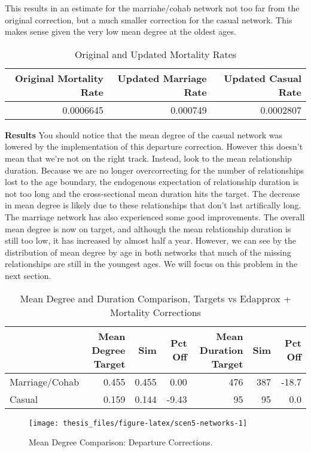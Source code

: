 \documentclass [11pt, proquest] {uwthesis}[2015/03/03]
\begin{document}
This results in an estimate for the marriahe/cohab network not too far
from the original correction, but a much smaller correction for the
casual network. This makes sense given the very low mean degree at the
oldest ages.
\begin{table}

\caption{\label{tab:departure-tab}Original and Updated Mortality Rates}
\centering
\begin{tabular}[t]{rrr}
\toprule
Original Mortality Rate & Updated Marriage Rate & Updated Casual Rate\\
\midrule
0.0006645 & 0.000749 & 0.0002807\\
\bottomrule
\end{tabular}
\end{table}
\textbf{Results} You should notice that the mean degree of the casual
network was lowered by the implementation of this departure correction.
However this doesn't mean that we're not on the right track. Instead,
look to the mean relationship duration. Because we are no longer
overcorrecting for the number of relationships lost to the age boundary,
the endogenous expectation of relationship duration is not too long and
the cross-sectional mean duration hits the target. The decrease in mean
degree is likely due to these relationships that don't last artifically
long. The marriage network has also experienced some good improvements.
The overall mean degree is now on target, and although the mean
relationship duration is still too low, it has increased by almost half
a year. However, we can see by the distribution of mean degree by age in
both networks that much of the missing relationships are still in the
youngest ages. We will focus on this problem in the next section.
\begin{table}

\caption{\label{tab:scen5-tab}Mean Degree and Duration Comparison, Targets vs Edapprox + Mortality Corrections}
\centering
\begin{tabular}[t]{lrrrrrr}
\toprule
  & Mean Degree Target & Sim & Pct Off & Mean Duration Target & Sim & Pct Off\\
\midrule
Marriage/Cohab & 0.455 & 0.455 & 0.00 & 476 & 387 & -18.7\\
Casual & 0.159 & 0.144 & -9.43 & 95 & 95 & 0.0\\
\bottomrule
\end{tabular}
\end{table}
\begin{figure}

{\centering \texttt{[image: thesis\_files/figure-latex/scen5-networks-1]} 

}

\caption{Mean Degree Comparison: Departure Corrections.}\label{fig:scen5-networks}
\end{figure}
\end{document}
